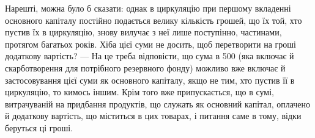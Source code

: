 Нарешті, можна було б сказати: однак в циркуляцію при першому
вкладенні основного капіталу постійно подається велику кількість грошей,
що їх той, хто пустив їх в циркуляцію, знову вилучає з неї лише поступінно,
частинами, протягом багатьох років. Хіба цієї суми не досить,
щоб перетворити на гроші додаткову вартість? — На це треба відповісти,
що сума в 500 (яка включає й скарботворення для потрібного
резервного фонду) можливо вже включає й застосовування цієї суми як
основного капіталу, якщо не тим, хто пустив її в циркуляцію, то кимось
іншим. Крім того вже припускається, що в сумі, витрачуваній на
придбання продуктів, що служать як основний капітал, оплачено й додаткову
вартість, що міститься в цих товарах, і питання саме в тому, відки
беруться ці гроші.
